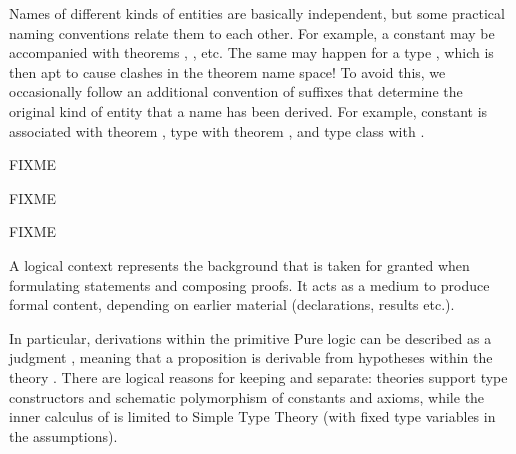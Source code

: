 \begin{isabellebody}
\begin{isamarkuptext}
Names of different kinds of entities are basically independent, but
some practical naming conventions relate them to each other.  For
example, a constant  may be accompanied with theorems
, ,  etc.  The
same may happen for a type , which is then apt to cause
clashes in the theorem name space!  To avoid this, we occasionally
follow an additional convention of suffixes that determine the
original kind of entity that a name has been derived.  For example,
constant  is associated with theorem ,
type  with theorem , and type
class  with .%
\end{isamarkuptext}%
\isamarkuptrue%
%
\endisatagFIXME
{\isafoldFIXME}%
%
\isadelimFIXME
%
\endisadelimFIXME
%
\isamarkuptrue%
%
\isamarkuptrue%
%
\begin{isamarkuptext}%
FIXME%
\end{isamarkuptext}%
\isamarkuptrue%
%
\isamarkuptrue%
%
\begin{isamarkuptext}%
FIXME%
\end{isamarkuptext}%
\isamarkuptrue%
%
\isamarkuptrue%
%
\begin{isamarkuptext}%
FIXME%
\end{isamarkuptext}%
\isamarkuptrue%
%
\isamarkuptrue%
%
\begin{isamarkuptext}%
A logical context represents the background that is taken for
  granted when formulating statements and composing proofs.  It acts
  as a medium to produce formal content, depending on earlier material
  (declarations, results etc.).

  In particular, derivations within the primitive Pure logic can be
  described as a judgment \isa{{\isasymGamma}\ {\isasymturnstile}\isactrlsub {\isasymTheta}\ {\isasymphi}}, meaning that a
  proposition \isa{{\isasymphi}} is derivable from hypotheses \isa{{\isasymGamma}}
  within the theory \isa{{\isasymTheta}}.  There are logical reasons for
  keeping \isa{{\isasymTheta}} and \isa{{\isasymGamma}} separate: theories support type
  constructors and schematic polymorphism of constants and axioms,
  while the inner calculus of \isa{{\isasymGamma}\ {\isasymturnstile}\ {\isasymphi}} is limited to Simple
  Type Theory (with fixed type variables in the assumptions).


\end{isamarkuptext}
\end{isabellebody}
